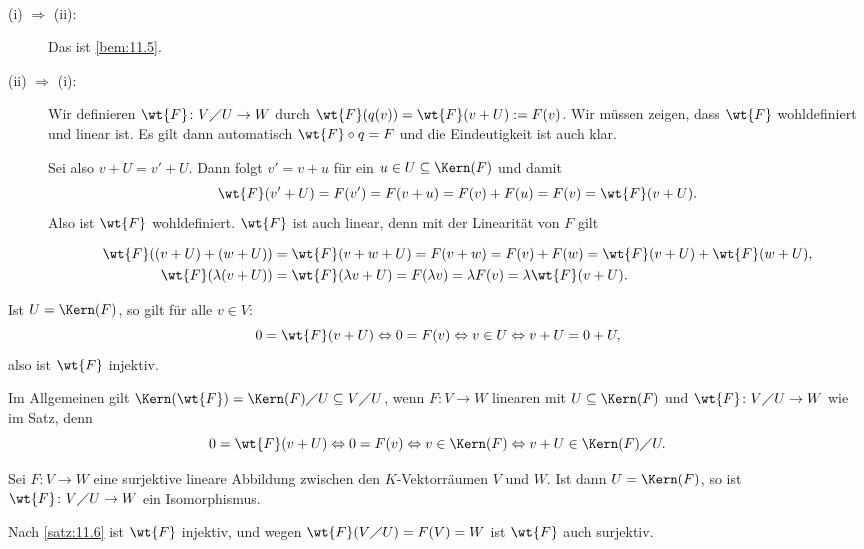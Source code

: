 \begin{beweis}
	\mbox{} \\[-.9cm]
	\begin{description}
		\item[(i) $\Rightarrow$ (ii):] Das ist \autoref{bem:11.5}.
		\item[(ii) $\Rightarrow$ (i):] Wir definieren $\wt{F}\colon V \diagup U \rightarrow W$ durch $\wt{F}(q(v)) = \wt{F}(v+U) := F(v)$.
		Wir müssen zeigen, dass $\wt{F}$ wohldefiniert und linear ist.
		Es gilt dann automatisch $\wt{F} \circ q = F$ und die Eindeutigkeit ist auch klar.
		
		Sei also $v + U = v' + U$.
		Dann folgt $v' = v+u$ für ein $u \in U \subseteq \Kern(F)$ und damit
		\[
			\wt{F}(v'+U) = F(v') = F(v+u) = F(v) + F(u) = F(v) = \wt{F}(v+U).
		\]
		Also ist $\wt{F}$ wohldefiniert.
		$\wt{F}$ ist auch linear, denn mit der Linearität von $F$ gilt
		\newpage
		
		\begin{align*}
			\wt{F}((v+U)+(w+U)) &= \wt{F}(v+w+U) = F(v+w) = F(v) + F(w) = \wt{F}(v+U) + \wt{F}(w+U), \\
			\wt{F}(\lambda(v+U)) &= \wt{F}(\lambda v + U) = F(\lambda v) =\lambda F(v) = \lambda \wt{F}(v+U).		
		\end{align*}
	\end{description}
	Ist $U = \Kern(F)$, so gilt für alle $v \in V$:
	\[
		0 = \wt{F}(v+U) \Leftrightarrow 0 = F(v) \Leftrightarrow v \in U \Leftrightarrow v + U = 0 + U,
	\]
	also ist $\wt{F}$ injektiv. \qedhere
\end{beweis}

\begin{bemerkung}
	\label{bem:11.7}
	Im Allgemeinen gilt $\Kern(\wt{F}) = \Kern(F) \diagup U \subseteq V \diagup U$, wenn $F \colon V \rightarrow W$ linearen mit $U \subseteq \Kern(F)$ und $\wt{F}\colon V \diagup U \rightarrow W$ wie im Satz, denn
	\[
		0 = \wt{F}(v+U) \Leftrightarrow 0 = F(v) \Leftrightarrow v \in \Kern(F) \Leftrightarrow v + U \in \Kern(F) \diagup U.
	\]
\end{bemerkung}

\begin{korollar}[Isomorphiesatz]
	\label{kor:11.8}
	Sei $F\colon V \rightarrow W$ eine surjektive lineare Abbildung zwischen den $K$-Vektorräumen $V$ und $W$.
	Ist dann $U = \Kern(F)$, so ist $\wt{F} \colon V \diagup U \rightarrow W$ ein Isomorphismus. 
\end{korollar}

\begin{beweis}
	Nach \autoref{satz:11.6} ist $\wt{F}$ injektiv, und wegen $\wt{F}(V \diagup U) = F(V) = W$ ist $\wt{F}$ auch surjektiv. \qedhere
\end{beweis}

